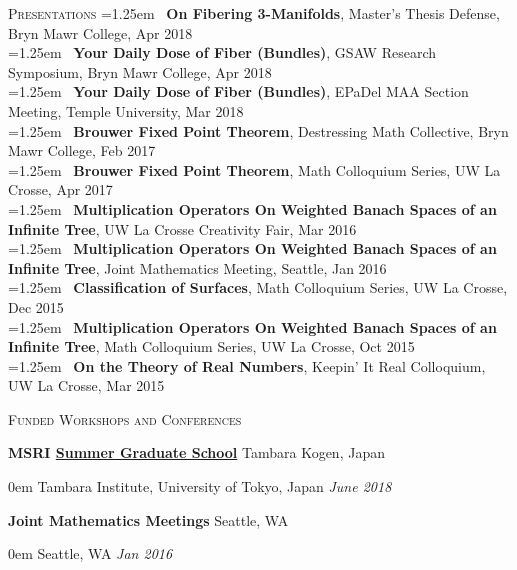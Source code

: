 \documentclass[11pt]{article}
\newenvironment{headitem}[2]{\hspace{.5em} \textbf{#1} \hfill #2 \begin{addmargin}[0em]{0em}}{\end{addmargin}}
\renewenvironment{section}[1]{\textsc{\large #1} \vskip5pt}{\vskip10pt}
\newcommand{\itemdate}[2]{\hspace{.5em} #1 \hfill \textit{#2} \\}
\newcommand{\itembul}[1]{\hangindent=1.25em \hspace{.4em} \textbullet \ #1 \\}
\begin{document}
\begin{section}{Presentations}
	\itembul{\textbf{On Fibering 3-Manifolds}, Master's Thesis Defense, Bryn Mawr College, Apr 2018} \vskip1.5pt
	\itembul{\textbf{Your Daily Dose of Fiber (Bundles)}, GSAW Research Symposium, Bryn Mawr College, Apr 2018} \vskip1.5pt
	\itembul{\textbf{Your Daily Dose of Fiber (Bundles)}, EPaDel MAA Section Meeting, Temple University, Mar 2018} \vskip1.5pt
	\itembul{\textbf{Brouwer Fixed Point Theorem}, Destressing Math Collective, Bryn Mawr College, Feb 2017} \vskip1.5pt
	\itembul{\textbf{Brouwer Fixed Point Theorem}, Math Colloquium Series, UW La Crosse, Apr 2017} \vskip1.5pt
	\itembul{\textbf{Multiplication Operators On Weighted Banach Spaces of an Infinite Tree}, UW La Crosse Creativity Fair, Mar 2016} \vskip1.5pt
	\itembul{\textbf{Multiplication Operators On Weighted Banach Spaces of an Infinite Tree}, Joint Mathematics Meeting, Seattle, Jan 2016} \vskip1.5pt
	\itembul{\textbf{Classification of Surfaces}, Math Colloquium Series, UW La Crosse, Dec 2015} \vskip1.5pt
	\itembul{\textbf{Multiplication Operators On Weighted Banach Spaces of an Infinite Tree}, Math Colloquium Series, UW La Crosse, Oct 2015} \vskip1.5pt
	\itembul{\textbf{On the Theory of Real Numbers}, Keepin' It Real Colloquium, UW La Crosse, Mar 2015} 
\end{section}



\begin{section}{Funded Workshops and Conferences}

	\begin{headitem}{MSRI \href{http://www.msri.org/web/msri/scientific/workshops/summer-graduate-school}{Summer Graduate School}}{Tambara Kogen, Japan}
		\itemdate{Tambara Institute, University of Tokyo, Japan}{June 2018}
	\end{headitem}
	\vskip5pt
	
	\begin{headitem}{Joint Mathematics Meetings}{Seattle, WA}
		\itemdate{Seattle, WA}{Jan 2016}
	\end{headitem}

\end{section}
\end{document}
